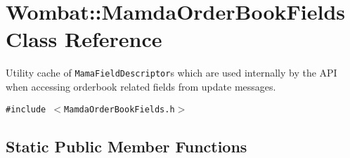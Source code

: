 \hypertarget{classWombat_1_1MamdaOrderBookFields}{
\section{Wombat::Mamda\-Order\-Book\-Fields Class Reference}
\label{classWombat_1_1MamdaOrderBookFields}
}
Utility cache of {\tt Mama\-Field\-Descriptor}s which are used internally by the API when accessing orderbook related fields from update messages.  


{\tt \#include $<$Mamda\-Order\-Book\-Fields.h$>$}

\subsection*{Static Public Member Functions}
